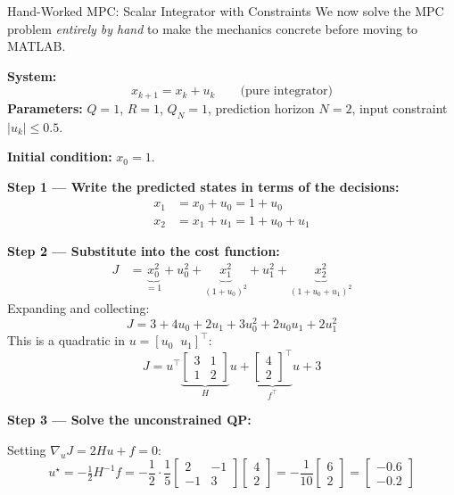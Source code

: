 \begin{examplebox}{Hand-Worked MPC: Scalar Integrator with Constraints}
We now solve the MPC problem \emph{entirely by hand} to make the mechanics concrete before moving to MATLAB.

\textbf{System:}
\[
x_{k+1} = x_k + u_k \qquad \text{(pure integrator)}
\]
\textbf{Parameters:} $Q = 1$, $R = 1$, $Q_N = 1$, prediction horizon $N = 2$, input constraint $|u_k| \le 0.5$.

\textbf{Initial condition:} $x_0 = 1$.

\textbf{Step 1 --- Write the predicted states in terms of the decisions:}
\begin{align*}
x_1 &= x_0 + u_0 = 1 + u_0 \\
x_2 &= x_1 + u_1 = 1 + u_0 + u_1
\end{align*}

\textbf{Step 2 --- Substitute into the cost function:}
\begin{align*}
J &= \underbrace{x_0^2}_{=1} + u_0^2 + \underbrace{x_1^2}_{(1+u_0)^2} + u_1^2 + \underbrace{x_2^2}_{(1+u_0+u_1)^2}
\end{align*}
Expanding and collecting:
\[
J = 3 + 4u_0 + 2u_1 + 3u_0^2 + 2u_0 u_1 + 2u_1^2
\]
This is a quadratic in $u = [u_0 \;\; u_1]^\top$:
\[
J = u^\top \underbrace{\begin{bmatrix} 3 & 1 \\ 1 & 2 \end{bmatrix}}_{H} u + \underbrace{\begin{bmatrix} 4 \\ 2 \end{bmatrix}^\top}_{f^\top} u + 3
\]

\textbf{Step 3 --- Solve the unconstrained QP:}

Setting $\nabla_{u} J = 2Hu + f = 0$:
\[
u^\star = -\tfrac{1}{2}H^{-1}f = -\frac{1}{2} \cdot \frac{1}{5}\begin{bmatrix} 2 & -1 \\ -1 & 3 \end{bmatrix}\begin{bmatrix} 4 \\ 2 \end{bmatrix} = -\frac{1}{10}\begin{bmatrix} 6 \\ 2 \end{bmatrix} = \begin{bmatrix} -0.6 \\ -0.2 \end{bmatrix}
\]


\end{examplebox}
